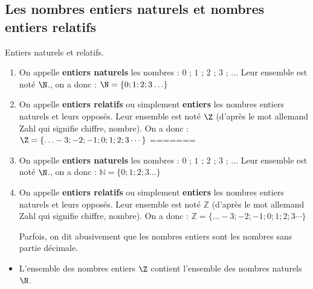 \begin{pageCours}


\section{Les nombres entiers naturels et nombres entiers relatifs}

\begin{DefT}{Entiers naturels et relatifs.}

\begin{enumerate}

\item On appelle \textbf{entiers naturels} les nombres : $0$ ; $1$ ; $2$ ; $3$ ; $\ldots$  Leur ensemble est noté $\N$., on a donc : $\N =  \lbrace 0 ; 1 ; 2 ; 3 \ldots \rbrace $
 
\item  On appelle \textbf{entiers relatifs} ou simplement \textbf{entiers} les nombres entiers naturels et leurs opposés. Leur ensemble est noté $\Z$ (d'après le mot allemand Zahl qui signifie chiffre, nombre).
On a donc : $\Z = \lbrace \ldots -3 ; -2 ; -1 ; 0 ; 1 ; 2 ; 3  \cdots  \rbrace$
=======
\item On appelle \textbf{entiers naturels} les nombres : $0$ ; $1$ ; $2$ ; $3$ ; $\ldots$  Leur ensemble est noté $\N$., on a donc : $\mathbb N=  \lbrace 0 ; 1 ; 2 ; 3 \ldots \rbrace $
 
\item  On appelle \textbf{entiers relatifs} ou simplement \textbf{entiers} les nombres entiers naturels et leurs opposés. Leur ensemble est noté $\mathbb Z$ (d'après le mot allemand Zahl qui signifie chiffre, nombre).
On a donc : $\mathbb Z = \lbrace \ldots -3 ; -2 ; -1 ; 0 ; 1 ; 2 ; 3  \cdots  \rbrace$

Parfois, on dit abusivement que les nombres entiers sont les nombres sans partie décimale.
\end{enumerate}
\end{DefT}

\begin{minipage}{0.6\linewidth}
\begin{Rqs} 
\begin{itemize}[leftmargin=*]
\item L'ensemble des nombres entiers $\Z$ contient l'ensemble des nombres naturels $\N$. 


\end{itemize}
\end{Rqs}
\end{minipage}
\end{pageCours}
